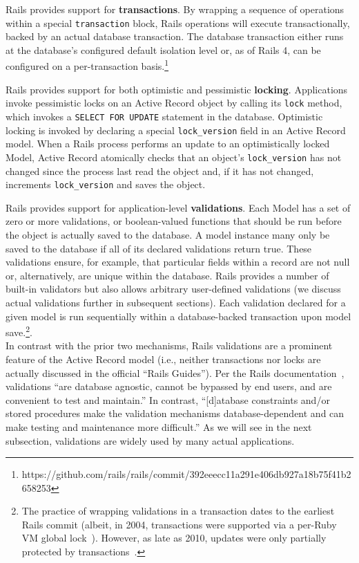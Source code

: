 \begin{myenumerate}
\item Rails provides support for \textbf{transactions}. By wrapping a
sequence of operations within a special \texttt{transaction} block,
Rails operations will execute transactionally, backed by an actual
database transaction. The database transaction either runs at the
database's configured default isolation level or, as of Rails 4, can
be configured on a per-transaction
basis.\footnote{https://github.com/rails/rails/commit/392eeecc11a291e406db927a18b75f41b2658253}

\item Rails provides support for both optimistic and pessimistic
\textbf{locking}. Applications invoke pessimistic locks on an Active
Record object by calling its \texttt{lock} method, which invokes a
\texttt{SELECT FOR UPDATE} statement in the database. Optimistic
locking is invoked by declaring a special \texttt{lock\_version} field
in an Active Record model. When a Rails process performs an update to
an optimistically locked Model, Active Record atomically checks that an object's
\texttt{lock\_version} has not changed since the process last read the
object and, if it has not changed, increments \texttt{lock\_version}
and saves the object.

\item Rails provides support for application-level
  \textbf{validations}. Each Model has a set of zero or more
  validations, or boolean-valued functions that should be run before
  the object is actually saved to the database. A model instance many
  only be saved to the database if all of its declared validations
  return true. These validations ensure, for example, that particular
  fields within a record are not null or, alternatively, are unique
  within the database. Rails provides a number of built-in validators
  but also allows arbitrary user-defined validations (we discuss
  actual validations further in subsequent sections). Each validation
  declared for a given model is run sequentially within a
  database-backed transaction upon model save.\footnote{The practice
    of wrapping validations in a transaction dates to the earliest
    Rails commit (albeit, in 2004, transactions were supported via a
    per-Ruby VM global lock~\cite{code-txn-lock}). However,
    as late as 2010, updates were only partially protected by
    transactions~\cite{code-txn-update}.}.\\[-2mm]

In contrast with the prior two mechanisms, Rails validations are a
prominent feature of the Active Record model (i.e., neither
transactions nor locks are actually discussed in the official ``Rails
Guides''). Per the Rails documentation~\cite{rails-guide}, validations ``are database
agnostic, cannot be bypassed by end users, and are convenient to test
and maintain.'' In contrast, ``[d]atabase constraints and/or stored procedures make the
validation mechanisms database-dependent and can make testing and
maintenance more difficult.'' As we will see in the next subsection,
validations are widely used by many actual applications.


\end{myenumerate}
